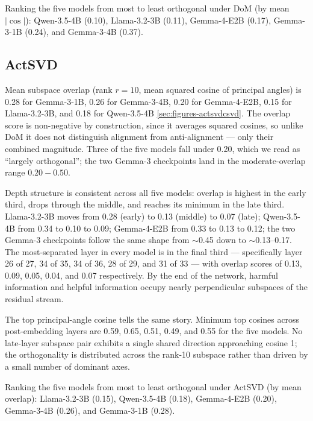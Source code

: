 Ranking the five models from most to least orthogonal under DoM
(by mean $|\cos|$): Qwen-3.5-4B (0.10), Llama-3.2-3B (0.11),
Gemma-4-E2B (0.17), Gemma-3-1B (0.24), and Gemma-3-4B (0.37).

\subsection{ActSVD}
\label{sec:results-actsvd}

Mean subspace overlap (rank $r=10$, mean squared cosine of principal
angles) is 0.28 for Gemma-3-1B, 0.26 for Gemma-3-4B, 0.20 for
Gemma-4-E2B, 0.15 for Llama-3.2-3B, and 0.18 for Qwen-3.5-4B
\ref{sec:figures-actsvdcsvd}. The overlap score is non-negative by
construction, since it averages squared cosines, so unlike DoM it
does not distinguish alignment from anti-alignment --- only their
combined magnitude. Three of the five models fall under 0.20, which
we read as ``largely orthogonal''; the two Gemma-3 checkpoints land
in the moderate-overlap range $0.20{-}0.50$.

Depth structure is consistent across all five models: overlap is
highest in the early third, drops through the middle, and reaches
its minimum in the late third. Llama-3.2-3B moves from 0.28 (early)
to 0.13 (middle) to 0.07 (late); Qwen-3.5-4B from 0.34 to 0.10 to
0.09; Gemma-4-E2B from 0.33 to 0.13 to 0.12; the two Gemma-3
checkpoints follow the same shape from $\sim$0.45 down to
$\sim$0.13--0.17. The most-separated layer in every model is in the
final third --- specifically layer 26 of 27, 34 of 35, 34 of 36,
28 of 29, and 31 of 33 --- with overlap scores of 0.13, 0.09, 0.05,
0.04, and 0.07 respectively. By the end of the network, harmful
information and helpful information occupy nearly perpendicular
subspaces of the residual stream.

The top principal-angle cosine tells the same story. Minimum top
cosines across post-embedding layers are 0.59, 0.65, 0.51, 0.49,
and 0.55 for the five models. No late-layer subspace pair exhibits
a single shared direction approaching cosine 1; the orthogonality
is distributed across the rank-10 subspace rather than driven by a
small number of dominant axes.

Ranking the five models from most to least orthogonal under
ActSVD (by mean overlap): Llama-3.2-3B (0.15), Qwen-3.5-4B (0.18),
Gemma-4-E2B (0.20), Gemma-3-4B (0.26), and Gemma-3-1B (0.28).

